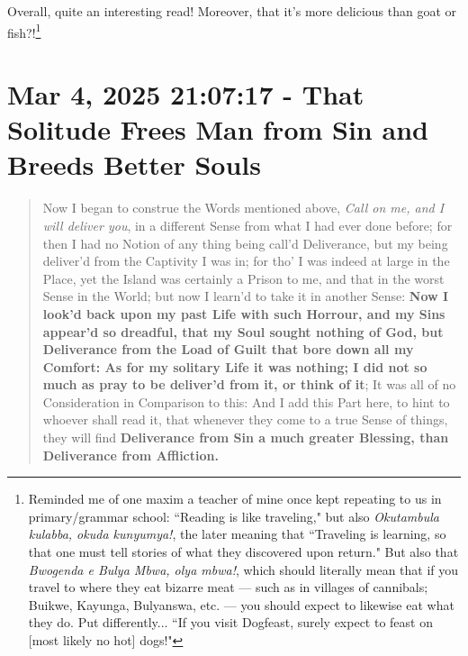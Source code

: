 \documentclass[a4paper]{article}
\begin{document}
Overall, quite an interesting read! Moreover, that it's more delicious than goat or fish?!\footnote{Reminded me of one maxim a teacher of mine once kept repeating to us in primary/grammar school: ``Reading is like traveling," but also \textit{Okutambula kulabba, okuda kunyumya!}, the later meaning that ``Traveling is learning, so that one must tell stories of what they discovered upon return." But also that \textit{Bwogenda e Bulya Mbwa, olya mbwa!}, which should literally mean that if you travel to where they eat bizarre meat --- such as in villages of cannibals; Buikwe, Kayunga, Bulyanswa, etc. --- you should expect to likewise eat what they do. Put differently... ``If you visit Dogfeast, surely expect to feast on [most likely no hot] dogs!"}






\section{Mar 4, 2025 21:07:17 - That Solitude Frees Man from Sin and Breeds Better Souls}
\label{SEC24}



\noindent
\begin{minipage}{1\textwidth}
\vspace{1em}
\begin{quotation}
{\ttfamily


Now I began to construe the Words mentioned above, \textit{Call on me, and I will deliver you}, in a different Sense from what I had ever done before; for then I had no Notion of any thing being call’d Deliverance, but my being deliver’d from the Captivity I was in; for tho’ I was indeed at large in the Place, yet the Island was certainly a Prison to me, and that in the worst Sense in the World; but now I learn’d to take it in another Sense: \textbf{Now I look’d back upon my past Life with such Horrour, and my Sins appear’d so dreadful, that my Soul sought nothing of God, but Deliverance from the Load of Guilt that bore down all my Comfort: As for my solitary Life it was nothing; I did not so much as pray to be deliver’d from it, or think of it}; It was all of no Consideration in Comparison to this: And I add this Part here, to hint to whoever shall read it, that whenever they come to a true Sense of things, they will find \textbf{Deliverance from Sin a much greater Blessing, than Deliverance from Affliction.}


}
\end{quotation}
\vspace{1em}
\end{minipage}
\end{document}
